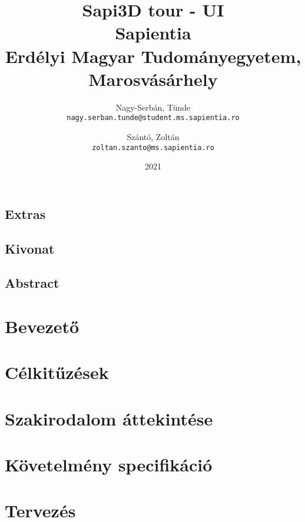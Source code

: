 \documentclass[12pt, twosides]{report}
\title{
	{Sapi3D tour - UI}\\
	{\large Sapientia\\
	Erdélyi Magyar Tudományegyetem, Marosvásárhely}
}
\author{
	Nagy-Serbán, Tünde\\
	\texttt{nagy.serban.tunde@student.ms.sapientia.ro}
	\and
	Szántó, Zoltán\\
	\texttt{zoltan.szanto@ms.sapientia.ro}	
}
\date{2021}
\begin{document}


\section*{Extras}

\pagebreak



\section*{Kivonat}

\pagebreak

\section*{Abstract}

\pagebreak


\tableofcontents

\listoffigures

\listoftables

\chapter{Bevezető}


\chapter{Célkitűzések}


\chapter{Szakirodalom áttekintése}


\chapter{Követelmény specifikáció}




\chapter{Tervezés}


\end{document}

